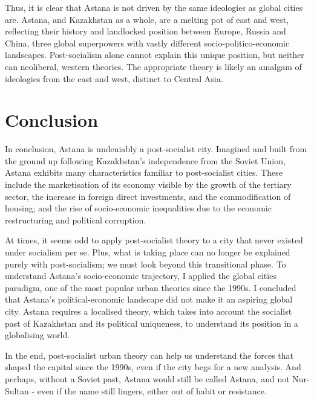 \documentclass{article}
\begin{document}
Thus, it is clear that Astana is not driven by the same ideologies as global cities are. Astana, and Kazakhstan as a whole, are a melting pot of east and west, reflecting their history and landlocked position between Europe, Russia and China, three global superpowers with vastly different socio-politico-economic landscapes. Post-socialism alone cannot explain this unique position, but neither can neoliberal, western theories. The appropriate theory is likely an amalgam of ideologies from the east and west, distinct to Central Asia.

\section{Conclusion}

In conclusion, Astana is undeniably a post-socialist city. Imagined and built from the ground up following Kazakhstan's independence from the Soviet Union, Astana exhibits many characteristics familiar to post-socialist cities. These include the marketisation of its economy visible by the growth of the tertiary sector, the increase in foreign direct investments, and the commodification of housing; and the rise of socio-economic inequalities due to the economic restructuring and political corruption.

At times, it seems odd to apply post-socialist theory to a city that never existed under socialism per se. Plus, what is taking place can no longer be explained purely with post-socialism; we must look beyond this transitional phase.
To understand Astana's socio-economic trajectory, I applied the global cities paradigm, one of the most popular urban theories since the 1990s. I concluded that Astana's political-economic landscape did not make it an aspiring global city.
 Astana requires a localised theory, which takes into account the socialist past of Kazakhstan and its political uniqueness, to understand its position in a globalising world.


In the end, post-socialist urban theory can help us understand the forces that shaped the capital since the 1990s, even if the city begs for a new analysis.
And perhaps, without a Soviet past, Astana would still be called Astana, and not Nur-Sultan - even if the name still lingers, either out of habit or resistance.

\end{document}
